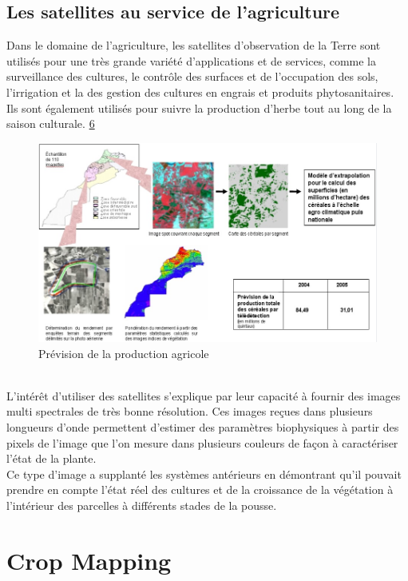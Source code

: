 \documentclass[12pt, openany]{report}
\begin{document}
\subsection{Les satellites au service de l'agriculture}
Dans le domaine de l'agriculture, les satellites d'observation de la Terre sont utilisés pour une très grande variété d’applications et de services, comme la surveillance des cultures, le contrôle des surfaces et de l'occupation des sols, l'irrigation et la des gestion des cultures en engrais et produits phytosanitaires. Ils sont également utilisés pour suivre la production d'herbe tout au long de la saison culturale.  \hyperref[sec:refs]{6}
\begin{figure}[hp]
\centering
\includegraphics[scale=0.65]{prev.jpg}
\caption{Prévision de la production agricole}
\end{figure}\\
L'intérêt d'utiliser des satellites s'explique par leur capacité à  fournir des images multi spectrales de très bonne résolution. Ces images reçues dans plusieurs longueurs d'onde permettent d'estimer des paramètres biophysiques à partir des pixels de l'image que l'on mesure dans plusieurs couleurs de façon à caractériser l'état de la plante.\\
Ce type d'image a supplanté les systèmes antérieurs en démontrant qu'il pouvait prendre en compte l'état réel des cultures et de la croissance de la végétation à l'intérieur des parcelles à différents stades de la pousse.

\section{Crop Mapping}
\end{document}
